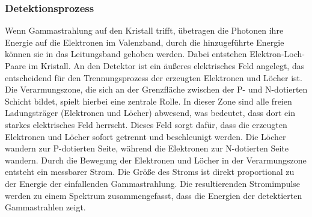 \subsubsection{Detektionsprozess}
Wenn Gammastrahlung auf den Kristall trifft, übetragen die Photonen ihre Energie auf die Elektronen im Valenzband, durch die hinzugeführte Energie 
können sie in das Leitungsband gehoben werden. Dabei entstehen Elektron-Loch-Paare im Kristall. An den Detektor ist ein äußeres
elektrisches Feld angelegt, das entscheidend für den Trennungsprozess der erzeugten Elektronen und Löcher ist.
Die Verarmungszone, die sich an der Grenzfläche zwischen der P- und N-dotierten Schicht bildet, spielt hierbei eine zentrale Rolle. In dieser Zone sind alle freien
Ladungsträger (Elektronen und Löcher) abwesend, was bedeutet, dass dort ein starkes elektrisches Feld herrscht. Dieses Feld sorgt dafür, dass die erzeugten Elektronen
und Löcher sofort getrennt und beschleunigt werden. Die Löcher wandern zur P-dotierten Seite, während die Elektronen zur N-dotierten Seite wandern.
Durch die Bewegung der Elektronen und Löcher in der Verarmungszone entsteht ein messbarer Strom. Die Größe des Stroms ist direkt proportional
zu der Energie der einfallenden Gammastrahlung. Die resultierenden Stromimpulse werden zu einem Spektrum zusammengefasst, dass die Energien der detektierten 
Gammastrahlen zeigt. 






 